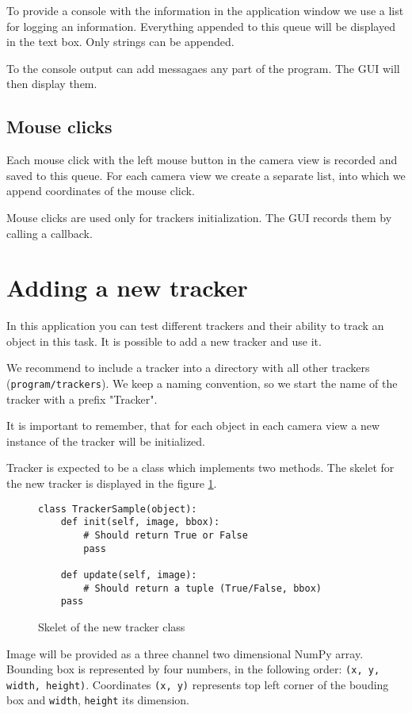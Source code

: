 To provide a console with the information in the application window we use a
list for logging an information. Everything appended to this queue will be
displayed in the text box. Only strings can be appended.

To the console output can add messagaes any part of the program. The GUI will
then display them.

\subsection*{Mouse clicks}

Each mouse click with the left mouse button in the camera view is recorded and
saved to this queue. For each camera view we create a separate list, into which
we append coordinates of the mouse click.

Mouse clicks are used only for trackers initialization. The GUI records them by
calling a callback.

\section{Adding a new tracker}
In this application you can test different trackers and their ability to track
an object in this task. It is possible to add a new tracker and use it.

We recommend to include a tracker into a directory with all other trackers
(\verb+program/trackers+). We keep a naming convention, so we start the name of
the tracker with a prefix "Tracker".

It is important to remember, that for each object in each camera view a new
instance of the tracker will be initialized.

Tracker is expected to be a class which implements two methods. The skelet for
the new tracker is displayed in the figure \ref{fig:new-tracker}.

\begin{figure}
\begin{verbatim}
class TrackerSample(object):
    def init(self, image, bbox):
    	# Should return True or False
    	pass

    def update(self, image):
    	# Should return a tuple (True/False, bbox)
	pass
\end{verbatim}
\caption{Skelet of the new tracker class}
\label{fig:new-tracker}
\end{figure}

Image will be provided as a three channel two dimensional NumPy array. Bounding
box is represented by four numbers, in the following order:
\verb+(x, y, width, height)+. Coordinates \verb+(x, y)+ represents top left corner of the bouding
box and \verb+width+, \verb+height+ its dimension.

